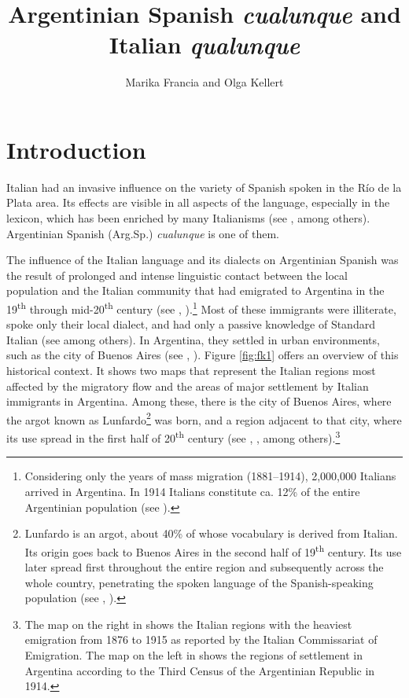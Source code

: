 \documentclass[output=paper,colorlinks,citecolor=brown]{langscibook}
\author{Marika Francia\orcid{}\affiliation{Georg-August-Universität Göttingen} and Olga Kellert\orcid{}\affiliation{Georg-August-Universität Göttingen}}
\title{Argentinian Spanish \textit{cualunque} and Italian \textit{qualunque}}
\begin{document}
\maketitle

\section{Introduction}\label{sec:fk1}
Italian had an invasive influence on the variety of Spanish spoken in the Río de la Plata area. Its effects are visible in all aspects of the language, especially in the lexicon, which has been enriched by many Italianisms (see \citealt{MeoZilio2001, DiTullio2003, EngelsKailuweit2011}, among others). Argentinian Spanish (Arg.Sp.) \textit{cualunque} is one of them.\largerpage[-1]

The influence of the Italian language and its dialects on Argentinian Spanish was the result of prolonged and intense linguistic contact between the local population and the Italian community that had emigrated to Argentina in the 19\textsuperscript{th} through mid-20\textsuperscript{th} century (see \citealt{MeoZilio1959, DiTullio2003}, \citealt[pt. 2.1]{Conde2011}).\footnote{Considering only the years of mass migration (1881--1914), 2,000,000 Italians arrived in Argentina. In 1914 Italians constitute ca. 12\% of the entire Argentinian population (see \cite[][32ff.]{Devoto2002}).} Most of these immigrants were illiterate, spoke only their local dialect, and had only a passive knowledge of Standard Italian (see \citealt{DeMauro2017} among others). In Argentina, they settled in urban environments, such as the city of Buenos Aires (see \cite[][pt. 2]{Baily1999}, \cite[][41]{Devoto2002}). Figure \ref{fig:fk1} offers an overview of this historical context. It shows two maps that represent the Italian regions most affected by the migratory flow and the areas of major settlement by Italian immigrants in Argentina. Among these, there is the city of Buenos Aires, where the argot known as Lunfardo\footnote{Lunfardo is an argot, about 40\% of whose vocabulary is derived from Italian. Its origin goes back to Buenos Aires in the second half of 19\textsuperscript{th} century. Its use later spread first throughout the entire region and subsequently across the whole country, penetrating the spoken language of the Spanish-speaking population (see \cite{Teruggi1974}, \cite{Conde2011}).} was born, and a region adjacent to that city, where its use spread in the first half of 20\textsuperscript{th} century (see \cite[32]{Teruggi1974}, \cite[pt. 1.2]{Conde2011}, among others).\footnote{The map on the right in  shows the Italian regions with the heaviest emigration from 1876 to 1915 as reported by the Italian Commissariat of Emigration. The map on the left in  shows the regions of settlement in Argentina according to the Third Census of the Argentinian Republic in 1914.}
\end{document}
